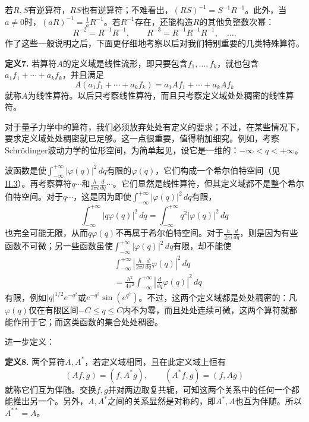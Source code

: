 \documentclass[fontsize=13pt,twoside,openany,headings=normal,parskip=false,bookmarkpackage=false,DIV=calc]{scrbook}
\begin{document}
若$R,\allowbreak S$有逆算符，$RS$也有逆算符；不难看出，$(RS)^{-1}=S^{-1}R^{-1}$。此外，当$a\ne0$时，$(aR)^{-1}=\frac1a R^{-1}$。若$R^{-1}$存在，还能构造$R$的其他负整数次幂：
\[
R^{-2}=R^{-1}R^{-1},\qquad R^{-3}=R^{-1}R^{-1}R^{-1},\quad\ldots.
\]
作了这些一般说明之后，下面更仔细地考察以后对我们特别重要的几类特殊算符。

\leavevmode{}\textbf{定义7.}\label{def:II.7} 若算符$A$的定义域是线性流形，即只要包含$f_1,\allowbreak \ldots,\allowbreak f_k$，就也包含$a_1f_1+\cdots+a_kf_k$，并且满足
\[
A(a_1f_1+\cdots+a_kf_k)=a_1Af_1+\cdots+a_kAf_k
\]
就称$A$为线性算符。以后只考察线性算符，而且只考察定义域处处稠密的线性算符。

对于量子力学中的算符，我们必须放弃处处有定义的要求；不过，在某些情况下，要求定义域处处稠密就已足够。这一点很重要，值得稍加细究。例如，考察Schr\"odinger波动力学的位形空间，为简单起见，设它是一维的：$-\infty<q<+\infty$。

\hypertarget{origpage-48}{}\label{origpage-48}波函数是使$\int_{-\infty}^{+\infty}|\varphi(q)|^2\,dq$有限的$\varphi(q)$，它们构成一个希尔伯特空间（见 \hyperref[sec:II.3]{II.3}）。再考察算符$q\cdots$和$\frac{h}{2\pi i}\frac{d}{dq}\cdots$。它们显然是线性算符，但其定义域都不是整个希尔伯特空间。对于$q\cdots$，这是因为即使$\int_{-\infty}^{+\infty}|\varphi(q)|^2\,dq$有限，
\[
\int_{-\infty}^{+\infty}|q\varphi(q)|^2\,dq=\int_{-\infty}^{+\infty}q^2|\varphi(q)|^2\,dq
\]
也完全可能无限，从而$q\varphi(q)$不再属于希尔伯特空间。对于$\frac{h}{2\pi i}\frac{d}{dq}$，则是因为有些函数不可微；另一些函数虽使$\int_{-\infty}^{+\infty}|\varphi(q)|^2\,dq$有限，却不能使
\begin{align*}
&\int_{-\infty}^{+\infty}\left|\frac{h}{2\pi i}\frac{d}{dq}\varphi(q)\right|^2\,dq\\
&=\frac{h^2}{4\pi^2}\int_{-\infty}^{+\infty}\left|\frac{d}{dq}\varphi(q)\right|^2\,dq
\end{align*}
有限，例如$|q|^{1/2}e^{-q^2}$或$e^{-q^2}\sin(e^{q^2})$。不过，这两个定义域都是处处稠密的：凡$\varphi(q)$仅在有限区间$-C\leq q\leq C$内不为零，而且处处连续可微，这两个算符就都能作用于它；而这类函数的集合处处稠密。

进一步定义：

\leavevmode{}\textbf{定义8.}\label{def:II.8} 两个算符$A,\allowbreak A^*$，若定义域相同，且在此定义域上恒有
\[
(Af,g)=(f,A^*g),\qquad(A^*f,g)=(f,Ag)
\]
就称它们互为伴随。交换$f,\allowbreak g$并对两边取复共轭，可知这两个关系中的任何一个都能推出另一个。另外，$A,\allowbreak A^*$之间的关系显然是对称的，即$A^*,\allowbreak A$也互为伴随。所以$A^{**}=A$。
\end{document}
